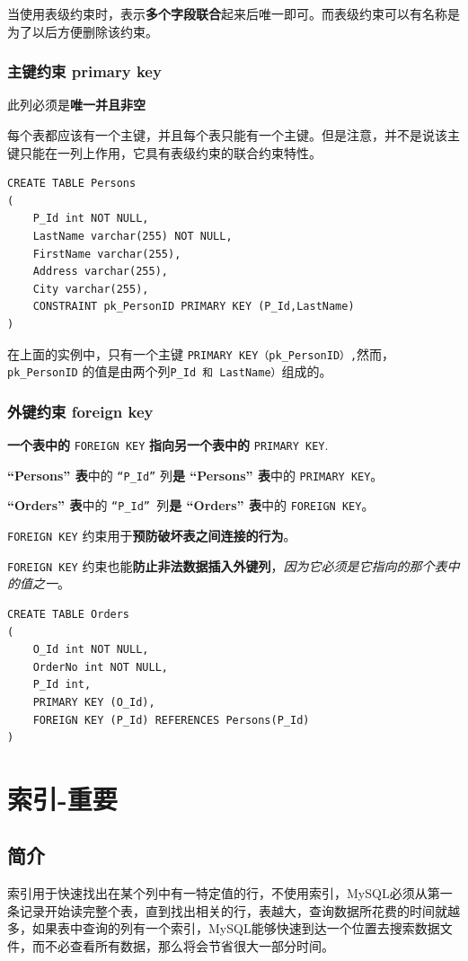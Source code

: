 \documentclass[UTF8,a4paper,12pt]{ctexbook}
\begin{document}
			当使用表级约束时，表示\textbf{多个字段联合}起来后唯一即可。而表级约束可以有名称是为了以后方便删除该约束。
			
		\subsection{主键约束 primary key}
			此列必须是\textbf{唯一并且非空}
			
			每个表都应该有一个主键，并且每个表只能有一个主键。但是注意，并不是说该主键只能在一列上作用，它具有表级约束的联合约束特性。
			\begin{lstlisting}
CREATE TABLE Persons
(
	P_Id int NOT NULL,
	LastName varchar(255) NOT NULL,
	FirstName varchar(255),
	Address varchar(255),
	City varchar(255),
	CONSTRAINT pk_PersonID PRIMARY KEY (P_Id,LastName)
)

			\end{lstlisting}
			在上面的实例中，只有一个主键 \verb|PRIMARY KEY（pk_PersonID）,|然而，\verb|pk_PersonID| 的值是由两个列\verb|P_Id 和 LastName）|组成的。
			
		\subsection{外键约束 foreign key}
			\textbf{一个表中的} \verb|FOREIGN KEY| \textbf{指向另一个表中的} \verb|PRIMARY KEY|.
			
			\textbf{“Persons” 表}中的 \verb|“P_Id”| 列\textbf{是 “Persons” 表}中的 \verb|PRIMARY KEY|。
			
			\textbf{“Orders” 表}中的 \verb|“P_Id” |列\textbf{是 “Orders” 表}中的 \verb|FOREIGN KEY|。
			
			\verb|FOREIGN KEY| 约束用于\textbf{预防破坏表之间连接的行为}。
			
			\verb|FOREIGN KEY| 约束也能\textbf{防止非法数据插入外键列}，\textit{因为它必须是它指向的那个表中的值之一}。
			
			\begin{lstlisting}
CREATE TABLE Orders
(
	O_Id int NOT NULL,
	OrderNo int NOT NULL,
	P_Id int,
	PRIMARY KEY (O_Id),
	FOREIGN KEY (P_Id) REFERENCES Persons(P_Id)
)
			\end{lstlisting}


\chapter{索引-重要}
	\section{简介}
		索引用于快速找出在某个列中有一特定值的行，不使用索引，MySQL必须从第一条记录开始读完整个表，直到找出相关的行，表越大，查询数据所花费的时间就越多，如果表中查询的列有一个索引，MySQL能够快速到达一个位置去搜索数据文件，而不必查看所有数据，那么将会节省很大一部分时间。
\end{document}
